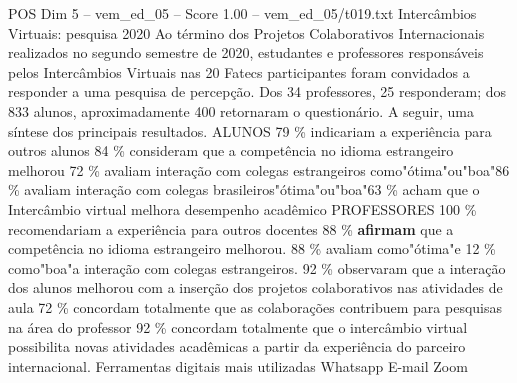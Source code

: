 \begin{textsample}{POS Dim 5 – vem\_ed\_05 – Score 1.00 – vem\_ed\_05/t019.txt}  \label{ex:f5_pos_072}
Intercâmbios Virtuais: pesquisa 2020 Ao término dos Projetos Colaborativos Internacionais realizados no segundo semestre de 2020, estudantes e professores responsáveis pelos Intercâmbios Virtuais nas 20 Fatecs participantes foram convidados a responder a uma pesquisa de percepção.
Dos 34 professores, 25 responderam; dos 833 alunos, aproximadamente 400 retornaram o questionário.
A seguir, uma síntese dos principais resultados.
ALUNOS 79 \% indicariam a experiência para outros alunos 84 \% consideram que a competência no idioma estrangeiro melhorou 72 \% avaliam interação com colegas estrangeiros como"ótima"ou"boa"86 \% avaliam interação com colegas brasileiros"ótima"ou"boa"63 \% acham que o Intercâmbio virtual melhora desempenho acadêmico PROFESSORES 100 \% recomendariam a experiência para outros docentes 88 \% \textbf{afirmam} que a competência no idioma estrangeiro melhorou. 88 \% avaliam como"ótima"e 12 \% como"boa"a interação com colegas estrangeiros. 92 \% observaram que a interação dos alunos melhorou com a inserção dos projetos colaborativos nas atividades de aula 72 \% concordam totalmente que as colaborações contribuem para pesquisas na área do professor 92 \% concordam totalmente que o intercâmbio virtual possibilita novas atividades acadêmicas a partir da experiência do parceiro internacional.
Ferramentas digitais mais utilizadas Whatsapp E-mail Zoom

\end{textsample}
